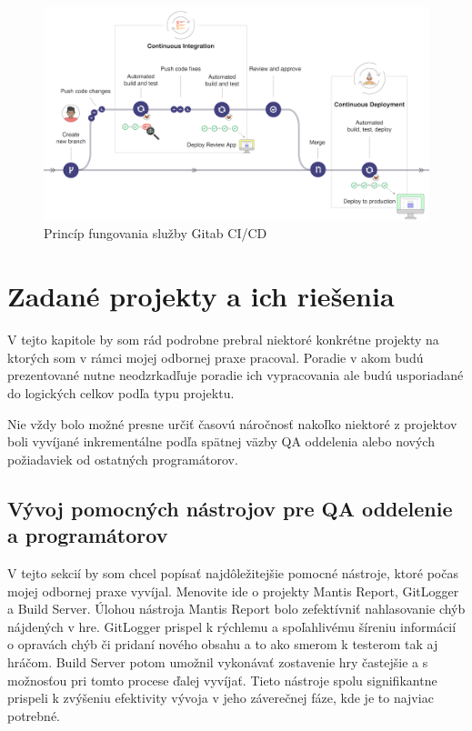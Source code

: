 \documentclass[slovak, bachelorpractice]{diploma}
\begin{document}
\begin{figure}[!htbp]
	\centering
	\includegraphics[width=.9\textwidth]{Pictures/gitlab.png}
	\vspace{-15pt}
	\caption[Princíp fungovania služby Gitab CI/CD]{Princíp fungovania služby Gitab CI/CD \cite{Cicd}}
	\label{pic:Gitlab}
\end{figure}

\chapter{Zadané projekty a ich riešenia}
\label{sec:Projects}
V tejto kapitole by som rád podrobne prebral niektoré konkrétne projekty na ktorých som v rámci mojej odbornej praxe pracoval. Poradie v akom budú prezentované nutne neodzrkadľuje poradie ich vypracovania ale budú usporiadané do logických celkov podľa typu projektu. 

Nie vždy bolo možné presne určiť časovú náročnosť nakoľko niektoré z projektov boli vyvíjané inkrementálne podľa spätnej väzby QA oddelenia alebo nových požiadaviek od ostatných programátorov.

\section{Vývoj pomocných nástrojov pre QA oddelenie a programátorov}
\label{sec:QACode}
V tejto sekcií by som chcel popísať najdôležitejšie pomocné nástroje, ktoré počas mojej odbornej praxe vyvíjal. Menovite ide o projekty Mantis Report, GitLogger a Build Server. Úlohou nástroja Mantis Report bolo zefektívniť nahlasovanie chýb nájdených v hre. GitLogger prispel k rýchlemu a spoľahlivému šíreniu informácií o opravách chýb či pridaní nového obsahu a to ako smerom k testerom tak aj hráčom. Build Server potom umožnil vykonávať zostavenie hry častejšie a s možnosťou pri tomto procese ďalej vyvíjať. Tieto nástroje spolu signifikantne prispeli k zvýšeniu efektivity vývoja v jeho záverečnej fáze, kde je to najviac potrebné.
\end{document}
